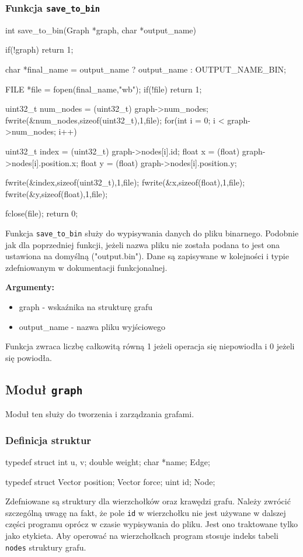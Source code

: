 \documentclass[]{article}
\begin{document}
\subsubsection{Funkcja \texttt{save\_to\_bin}}
\begin{mylisting}
int save_to_bin(Graph *graph, char *output_name) {
    if(!graph) return 1;

    char *final_name = output_name ? output_name : OUTPUT_NAME_BIN;

    FILE *file = fopen(final_name,"wb");
    if(!file) return 1;
    
    uint32_t num_nodes = (uint32_t) graph->num_nodes;
    fwrite(&num_nodes,sizeof(uint32_t),1,file);
    for(int i = 0; i < graph->num_nodes; i++) {
        uint32_t index = (uint32_t) graph->nodes[i].id;
        float x = (float) graph->nodes[i].position.x;
        float y = (float) graph->nodes[i].position.y;

        fwrite(&index,sizeof(uint32_t),1,file);
        fwrite(&x,sizeof(float),1,file);
        fwrite(&y,sizeof(float),1,file);
    }
    fclose(file);
    return 0;
}
\end{mylisting}
Funkcja \texttt{save\_to\_bin} służy do wypisywania danych do pliku binarnego. Podobnie jak dla poprzedniej funkcji, jeżeli
nazwa pliku nie została podana to jest ona ustawiona na domyślną ("output.bin"). Dane są zapisywane w kolejności i typie zdefniowanym
w dokumentacji funkcjonalnej. 

\textbf{Argumenty:}
\begin{itemize}
    \item graph - wskaźnika na strukturę grafu 
    \item output\_name - nazwa pliku wyjściowego
\end{itemize}
Funkcja zwraca liczbę całkowitą równą 1 jeżeli operacja się niepowiodła i 0 jeżeli się powiodła.

\subsection{Moduł \texttt{graph}}

Moduł ten służy do tworzenia i zarządzania grafami.

\subsubsection{Definicja struktur}
\begin{mylisting}
typedef struct {
    int u, v;
    double weight;
    char *name;
} Edge;

typedef struct {
    Vector position;
    Vector force;
    uint id;
} Node;
\end{mylisting}
Zdefniowane są struktury dla wierzchołków oraz krawędzi grafu. Należy zwrócić szczególną uwagę na fakt, że pole \texttt{id} w wierzchołku nie jest używane w dalszej części programu oprócz w czasie wypisywania do pliku. Jest ono traktowane tylko jako etykieta. Aby operować na wierzchołkach program stosuje indeks tabeli \texttt{nodes} struktury grafu.
\end{document}
